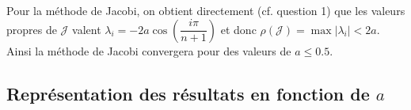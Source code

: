 Pour la méthode de Jacobi, on obtient directement (cf. question 1) que les valeurs propres de $\mathcal{J}$ valent
$\lambda _i = -2a \cos(\dfrac{i \pi}{n+1})$ et donc $\rho(\mathcal{J}) = \max |\lambda_i| < 2a$.
Ainsi la méthode de Jacobi convergera pour des valeurs de $a \leq 0.5$.

\subsection{Représentation des résultats en fonction de $a$}
